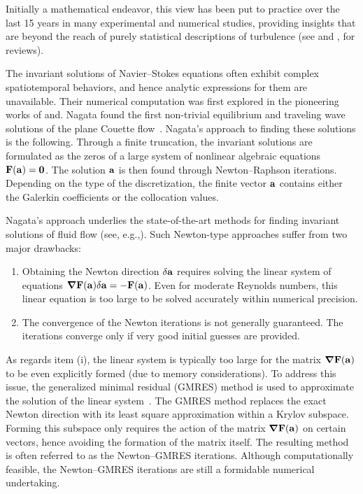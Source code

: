 \documentclass{article}
\begin{document}
Initially a mathematical endeavor, this view has been put to practice over the last
15 years in many experimental and numerical studies, providing insights
that are beyond the reach of purely statistical descriptions of turbulence
(see  and , for reviews). %

The invariant solutions of Navier--Stokes equations often exhibit
complex spatiotemporal behaviors, and hence analytic expressions for them
are unavailable. Their numerical computation was first
explored in the pioneering works of and.
Nagata found the first non-trivial equilibrium and traveling wave solutions
of the plane Couette flow~\citep{N90,N97}.
Nagata's approach to finding these solutions is the following.
Through a finite truncation, the invariant solutions are formulated as the zeros of
a large system of nonlinear algebraic equations $\mathbf F(\mathbf a)=\mathbf 0$. The solution $\mathbf a$ is
then found through Newton--Raphson iterations. Depending on the type of the
discretization, the finite vector $\mathbf a$ contains either
the Galerkin coefficients or the collocation values.

Nagata's approach underlies the state-of-the-art methods for finding invariant solutions
of fluid flow
(see, e.g.,). Such Newton-type approaches suffer from two
major drawbacks:
\begin{enumerate}\renewcommand{\theenumi}{\roman{enumi}}
\item Obtaining the Newton direction $\delta\mathbf a$ requires solving the linear system of equations
$\mbox{\boldmath $\nabla$}\mathbf F(\mathbf a)\delta\mathbf a=-\mathbf F(\mathbf a)$.
Even for moderate Reynolds numbers, this linear equation
is too large to be solved accurately within numerical precision.
\item The convergence of the Newton iterations is not generally guaranteed. The iterations converge
only if very good initial guesses are provided.
\end{enumerate}

As regards item (i), the linear system is typically too large for the
matrix $\mbox{\boldmath $\nabla$}\mathbf F(\mathbf a)$ to be even
explicitly formed (due to memory considerations). To address this issue,
 the generalized minimal residual (GMRES) method is used to
approximate the solution of the linear system~\citep{gmres}. The GMRES method replaces the
exact Newton direction with its least square approximation within a Krylov subspace.
Forming this subspace only requires the action of the matrix $\mbox{\boldmath $\nabla$}\mathbf F(\mathbf a)$ on certain
vectors, hence avoiding the formation of the matrix itself.
The resulting method is often referred to as the Newton--GMRES iterations.
Although computationally feasible, the Newton--GMRES iterations are still
a formidable numerical undertaking.
\end{document}
